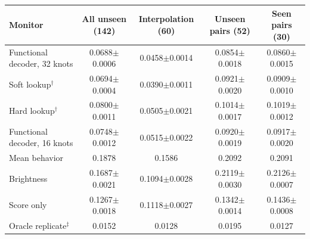 \setlength{\tabcolsep}{3pt}
\begin{tabular}{lcccc}
\toprule
Monitor & All unseen (142) & Interpolation (60) & Unseen pairs (52) & Seen pairs (30) \\
\midrule
Functional decoder, 32 knots & 0.0688$\pm$0.0006 & 0.0458$\pm$0.0014 & 0.0854$\pm$0.0018 & 0.0860$\pm$0.0015 \\
Soft lookup$^\dagger$ & 0.0694$\pm$0.0004 & 0.0390$\pm$0.0011 & 0.0921$\pm$0.0020 & 0.0909$\pm$0.0010 \\
Hard lookup$^\dagger$ & 0.0800$\pm$0.0011 & 0.0505$\pm$0.0021 & 0.1014$\pm$0.0017 & 0.1019$\pm$0.0012 \\
Functional decoder, 16 knots & 0.0748$\pm$0.0012 & 0.0515$\pm$0.0022 & 0.0920$\pm$0.0019 & 0.0917$\pm$0.0020 \\
Mean behavior & 0.1878 & 0.1586 & 0.2092 & 0.2091 \\
Brightness & 0.1687$\pm$0.0021 & 0.1094$\pm$0.0028 & 0.2119$\pm$0.0030 & 0.2126$\pm$0.0007 \\
Score only & 0.1267$\pm$0.0018 & 0.1118$\pm$0.0027 & 0.1342$\pm$0.0014 & 0.1436$\pm$0.0008 \\
Oracle replicate$^\ddagger$ & 0.0152 & 0.0128 & 0.0195 & 0.0127 \\
\bottomrule
\end{tabular}
